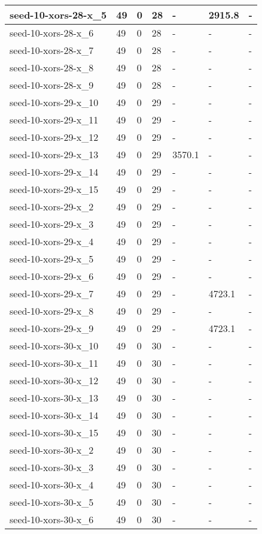 \begin{scriptsize}
\begin{longtable}{|p{5cm}|l|l|l|l|l|l|}
seed-10-xors-28-x\_5&49&0&28&-&2915.8&- \\ \hline 
seed-10-xors-28-x\_6&49&0&28&-&-&- \\ \hline 
seed-10-xors-28-x\_7&49&0&28&-&-&- \\ \hline 
seed-10-xors-28-x\_8&49&0&28&-&-&- \\ \hline 
seed-10-xors-28-x\_9&49&0&28&-&-&- \\ \hline 
seed-10-xors-29-x\_10&49&0&29&-&-&- \\ \hline 
seed-10-xors-29-x\_11&49&0&29&-&-&- \\ \hline 
seed-10-xors-29-x\_12&49&0&29&-&-&- \\ \hline 
seed-10-xors-29-x\_13&49&0&29&3570.1&-&- \\ \hline 
seed-10-xors-29-x\_14&49&0&29&-&-&- \\ \hline 
seed-10-xors-29-x\_15&49&0&29&-&-&- \\ \hline 
seed-10-xors-29-x\_2&49&0&29&-&-&- \\ \hline 
seed-10-xors-29-x\_3&49&0&29&-&-&- \\ \hline 
seed-10-xors-29-x\_4&49&0&29&-&-&- \\ \hline 
seed-10-xors-29-x\_5&49&0&29&-&-&- \\ \hline 
seed-10-xors-29-x\_6&49&0&29&-&-&- \\ \hline 
seed-10-xors-29-x\_7&49&0&29&-&4723.1&- \\ \hline 
seed-10-xors-29-x\_8&49&0&29&-&-&- \\ \hline 
seed-10-xors-29-x\_9&49&0&29&-&4723.1&- \\ \hline 
seed-10-xors-30-x\_10&49&0&30&-&-&- \\ \hline 
seed-10-xors-30-x\_11&49&0&30&-&-&- \\ \hline 
seed-10-xors-30-x\_12&49&0&30&-&-&- \\ \hline 
seed-10-xors-30-x\_13&49&0&30&-&-&- \\ \hline 
seed-10-xors-30-x\_14&49&0&30&-&-&- \\ \hline 
seed-10-xors-30-x\_15&49&0&30&-&-&- \\ \hline 
seed-10-xors-30-x\_2&49&0&30&-&-&- \\ \hline 
seed-10-xors-30-x\_3&49&0&30&-&-&- \\ \hline 
seed-10-xors-30-x\_4&49&0&30&-&-&- \\ \hline 
seed-10-xors-30-x\_5&49&0&30&-&-&- \\ \hline 
seed-10-xors-30-x\_6&49&0&30&-&-&- \\ \hline 

\end{longtable}
\end{scriptsize}
